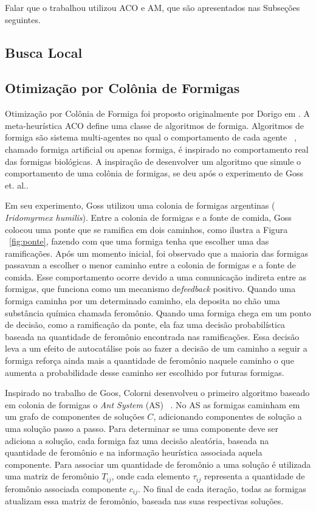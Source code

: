 Falar que o trabalhou utilizou ACO e AM, que são apresentados nas
Subseções seguintes.

\subsection{Busca Local}

\subsection{Otimização por Colônia de Formigas}

Otimização por Colônia de Formiga foi proposto originalmente por Dorigo em
\cite{aco-origin}. A meta-heurística ACO define uma classe de algoritmos
de formiga. Algoritmos de formiga são sistema multi-agentes no qual o
comportamento de cada agente ~\cite{aco-origin2}, chamado formiga artificial
ou apenas formiga, é inspirado no comportamento real das formigas biológicas.
A inspiração de desenvolver um algoritmo que simule o comportamento de uma
colônia de formigas, se deu após o experimento de Goss et. al.\cite{Goss}.

Em seu experimento, Goss utilizou uma colonia de formigas argentinas ({\it
Iridomyrmex humilis}). Entre a colonia de formigas e a fonte de comida, Goss
colocou uma ponte que se ramifica em dois caminhos, como ilustra a Figura
~\ref{fig:ponte}, fazendo com que uma formiga tenha que escolher uma das
ramificações. Após um momento inicial, foi observado que a maioria das
formigas passavam a escolher o menor caminho entre a colonia de formigas
e a fonte de comida. Esse comportamento ocorre devido a uma comunicação
indireta entre as formigas, que funciona como um mecanismo de{\it feedback}
positivo. Quando uma formiga caminha por um determinado caminho, ela deposita
no chão uma substância química chamada feromônio. Quando uma formiga
chega em um ponto de decisão, como a ramificação da ponte, ela faz uma
decisão probabilística baseada na quantidade de feromônio encontrada
nas ramificações. Essa decisão leva a um efeito de autocatálise pois
ao fazer a decisão de um caminho a seguir a formiga reforça ainda mais a
quantidade de feromônio naquele caminho o que aumenta a probabilidade desse
caminho ser escolhido por futuras formigas.

Inspirado no trabalho de Goos, Colorni desenvolveu o primeiro algoritmo
baseado em colonia de formigas o {\it Ant System} (AS) ~\cite{as-origin}.
No AS as formigas caminham em um grafo de componentes de soluções $C$,
adicionando componentes de solução a uma solução passo a passo. Para
determinar se uma componente deve ser adiciona a solução, cada formiga
faz uma decisão aleatória, baseada na quantidade de feromônio e
na informação heurística associada aquela componente. Para associar um
quantidade de feromônio a uma solução é utilizada uma matriz de feromônio
$T_{ij}$, onde cada elemento $\tau_{ij}$ representa a quantidade de feromônio
associada componente $c_{ij}$. No final de cada iteração, todas as formigas
atualizam essa matriz de feromônio, baseada nas suas respectivas soluções.

